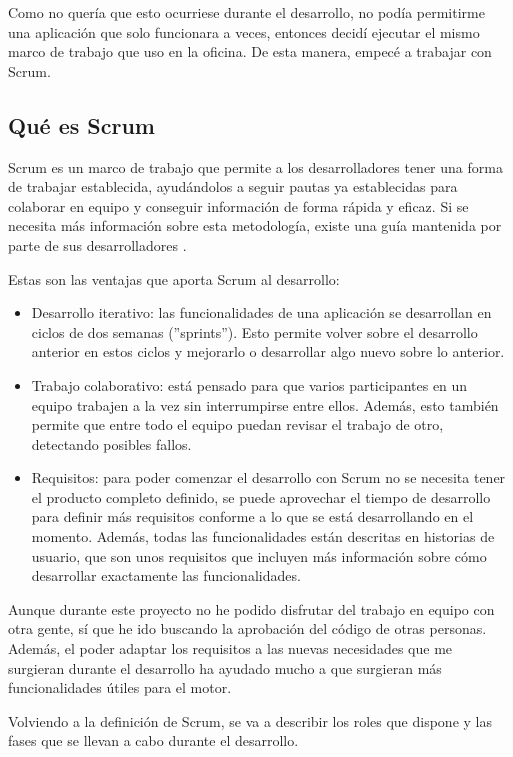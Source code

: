 Como no quería que esto ocurriese durante el desarrollo, no podía permitirme una aplicación que solo funcionara a veces, entonces decidí ejecutar el mismo marco de trabajo que uso en la oficina. De esta manera, empecé a trabajar con Scrum.

\subsection{Qué es Scrum}
Scrum es un marco de trabajo que permite a los desarrolladores tener una forma de trabajar establecida, ayudándolos a seguir pautas ya establecidas para colaborar en equipo y conseguir información de forma rápida y eficaz.
Si se necesita más información sobre esta metodología, existe una guía mantenida por parte de sus desarrolladores \cite{scrumGuides}.

Estas son las ventajas que aporta Scrum al desarrollo:
\begin{itemize}
	\item Desarrollo iterativo: las funcionalidades de una aplicación se desarrollan en ciclos de dos semanas (''sprints''). Esto permite volver sobre el desarrollo anterior en estos ciclos y mejorarlo o desarrollar algo nuevo sobre lo anterior.
	\item Trabajo colaborativo: está pensado para que varios participantes en un equipo trabajen a la vez sin interrumpirse entre ellos. Además, esto también permite que entre todo el equipo puedan revisar el trabajo de otro, detectando posibles fallos.
	\item Requisitos: para poder comenzar el desarrollo con Scrum no se necesita tener el producto completo definido, se puede aprovechar el tiempo de desarrollo para definir más requisitos conforme a lo que se está desarrollando en el momento.
	Además, todas las funcionalidades están descritas en historias de usuario, que son unos requisitos que incluyen más información sobre cómo desarrollar exactamente las funcionalidades.
\end{itemize}

Aunque durante este proyecto no he podido disfrutar del trabajo en equipo con otra gente, sí que he ido buscando la aprobación del código de otras personas. Además, el poder adaptar los requisitos a las nuevas necesidades que me surgieran durante el desarrollo ha ayudado mucho a que surgieran más funcionalidades útiles para el motor.

Volviendo a la definición de Scrum, se va a describir los roles que dispone y las fases que se llevan a cabo durante el desarrollo.


